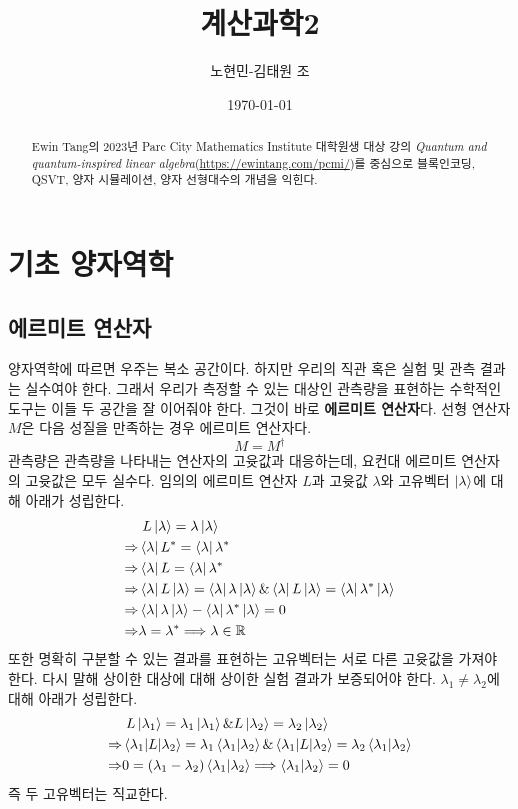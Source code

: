 \documentclass[a4paper,atbegshi,chapter,]{oblivoir}
\title{계산과학2}
\author{노현민-김태원 조}
\date{\today}
\begin{document}
\maketitle
\begin{abstract}
Ewin Tang의 2023년 Parc City Mathematics Institute 대학원생 대상 강의
{\slshape Quantum and quantum-inspired linear algebra}(\url{https://ewintang.com/pcmi/})를
중심으로 블록인코딩, QSVT, 양자 시뮬레이션, 양자 선형대수의 개념을 익힌다. 
\end{abstract}\pagestyle{empty}\newpage
\tableofcontents
\setcounter{chapter}{-1}
\chapter{기초 양자역학}
\section{에르미트 연산자}
양자역학에 따르면 우주는 복소 공간이다. 하지만 우리의 직관 혹은 실험 및 관측 결과는
실수여야 한다. 그래서 우리가 측정할 수 있는 대상인 관측량을 표현하는 수학적인 도구는
이들 두 공간을 잘 이어줘야 한다. 그것이 바로 \textbf{에르미트 연산자}다. 선형 연산자
$M$은 다음 성질을 만족하는 경우 에르미트 연산자다. 
\[
  M = M^{\dagger}
\]
관측량은 관측량을 나타내는 연산자의 고윳값과 대응하는데, 요컨대 에르미트 연산자의
고윳값은 모두 실수다. 임의의 에르미트 연산자 $L$과 고윳값 $\lambda$와 고유벡터
$\ket{\lambda}$에 대해 아래가 성립한다.
\begin{align*}
  &\;L\ket{\lambda} = \lambda\ket{\lambda} \\
  \Rightarrow & \bra{\lambda}L^* = \bra{\lambda}\lambda^* \\
  \Rightarrow & \bra{\lambda}L=\bra{\lambda}\lambda^* \\
  \Rightarrow & \bra{\lambda}L\ket{\lambda} =\bra{\lambda}\lambda\ket{\lambda} \&
  \bra{\lambda}L\ket{\lambda} = \bra{\lambda}\lambda^*\ket{\lambda} \\
  \Rightarrow&\bra{\lambda}\lambda\ket{\lambda} - \bra{\lambda}\lambda^*\ket{\lambda} = 0\\
  \Rightarrow & \lambda = \lambda^* \Longrightarrow \lambda\in\mathbb{R}
\end{align*}
또한 명확히 구분할 수 있는 결과를 표현하는 고유벡터는 서로 다른 고윳값을 가져야 한다.
다시 말해 상이한 대상에 대해 상이한 실험 결과가 보증되어야 한다. $\lambda_1\neq\lambda_2$에
대해 아래가 성립한다.
\begin{align*}
  &\;L\ket{\lambda_1}=\lambda_1\ket{\lambda_1}\&L\ket{\lambda_2}=\lambda_2\ket{\lambda_2}\\
  \Rightarrow&\braket{\lambda_1|L|\lambda_2} = \lambda_1\braket{\lambda_1|\lambda_2} \&
  \braket{\lambda_1|L|\lambda_2}=\lambda_2\braket{\lambda_1|\lambda_2}\\
  \Rightarrow & 0 = (\lambda_1-\lambda_2)\braket{\lambda_1|\lambda_2}
  \Longrightarrow \braket{\lambda_1|\lambda_2} = 0
\end{align*}
즉 두 고유벡터는 직교한다. 
\end{document}
